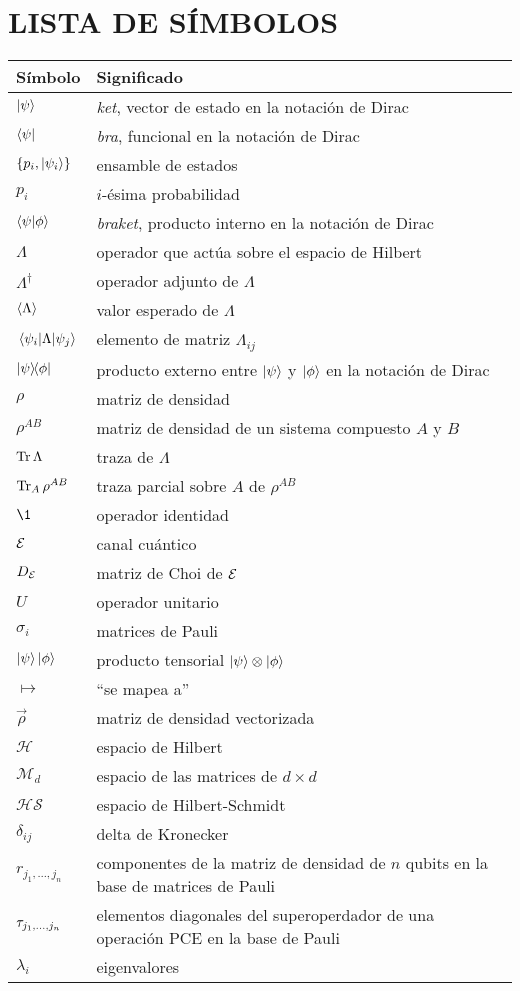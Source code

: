 

\chapter{LISTA DE SÍMBOLOS}

\begin{longtable}{@{}l@{\extracolsep{\fill}} p{4.75in} @{}}  %
  \textsf{Símbolo} & \textsf{Significado}\\[12pt]
  \endhead
  $\ket{\psi}$ &  \textit{ket}, vector de estado en la notación de Dirac \\
  $\bra{\psi}$ & \textit{bra}, funcional en la notación de Dirac\\
  $\qty{p_i,\ket{\psi_i}}$ & ensamble de estados \\
  $p_i$ & $i$-ésima probabilidad\\
  $\braket{\psi}{\phi}$ & \textit{braket}, producto interno en la notación de Dirac\\
  $\Lambda$ &  operador que actúa sobre el espacio de Hilbert\\
  $\Lambda^{\dagger}$ & operador adjunto de $\Lambda$\\
  $\expval{\Lambda}$ & valor esperado de $\Lambda$\\
  $\matrixel{\psi_i}{\Lambda}{\psi_j}$ & elemento de matriz $\Lambda_{ij}$\\
  $\dyad{\psi}{\phi}$ & producto externo entre $\ket{\psi}$ y $\ket{\phi}$ en la notación de Dirac \\
  $\rho$ & matriz de densidad\\
  $\rho^{AB}$ & matriz de densidad de un sistema compuesto $A$ y $B$\\
  $\Tr \Lambda$ & traza de $\Lambda$\\
  $\Tr_{A}\rho^{AB}$ & traza parcial sobre $A$ de $\rho^{AB}$\\
  	$\1$ & operador identidad \\
	$\mathcal{E}$ & canal cuántico \\
	$D_{\mathcal{E}}$ & matriz de Choi de $\mathcal{E}$\\
	$U$ & operador unitario \\
	$\sigma_i$ & matrices de Pauli\\
	$\ket{\psi}\ket{\phi}$ & producto tensorial $\ket{\psi}\otimes\ket{\phi}$\\
	$\mapsto$ & ``se mapea a''\\
	$\vec\rho$ & matriz de densidad vectorizada\\
	$\mathcal{H}$ & espacio de Hilbert\\
	$\mathcal{M}_d$ & espacio de las matrices de $d\times d$\\
	$\mathcal{HS}$ & espacio de Hilbert-Schmidt\\
	$\delta_{ij}$ & delta de Kronecker\\
	$r_{j_1,\ldots,j_n}$ & componentes de la matriz de densidad de $n$ qubits en la base
	de matrices de Pauli \\
	$\tau_{j_1,\ldots ,j_n}$ & elementos diagonales del superoperdador de una operación 
	PCE en la base de Pauli\\
	$\lambda_i$ & eigenvalores
\end{longtable}
